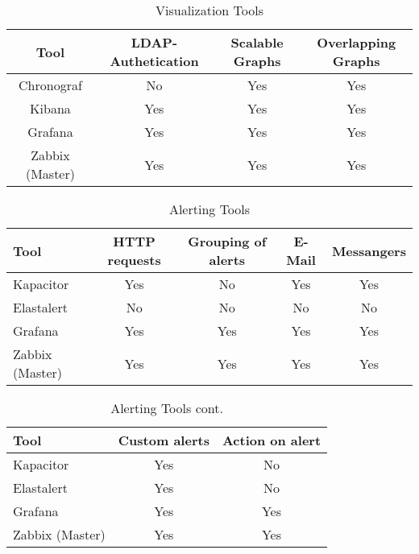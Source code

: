 \begin{table}[]
\centering
\caption{Visualization Tools}
\label{my-label}
\begin{tabular}{cccc}
	\hline
Tool & LDAP-Authetication         & Scalable Graphs             & Overlapping Graphs          \\
\hline
Chronograf                   & No & Yes                         & Yes                         \\
Kibana                       & Yes                        & Yes & Yes                         \\
Grafana                      & Yes                        & Yes & Yes                         \\
Zabbix (Master)              & Yes                        & Yes                         & Yes\\
\hline
\end{tabular}
\end{table}

\begin{table}[]
	\centering
	\caption{Alerting Tools}
	\label{my-label}
	\begin{tabular}{lcccc}
		\hline
		Tool & HTTP requests & Grouping of alerts         & E-Mail                      & Messangers \\
		\hline
		Kapacitor                    & Yes           & No & Yes                         & Yes \\
		Elastalert                   & No            & No                         & No  & No  \\
		Grafana                      & Yes           & Yes                        & Yes & Yes \\
		Zabbix (Master)              & Yes           & Yes                        & Yes                         & Yes \\
		\hline
	\end{tabular}
\end{table}

\begin{table}[]
	\centering
	\caption{Alerting Tools cont.}
	\label{my-label}
	\begin{tabular}{lcc}
		\hline
		Tool & Custom alerts & Action on alert \\
		\hline
		Kapacitor                    & Yes           & No              \\
		Elastalert                   & Yes           & No              \\
		Grafana                      & Yes           & Yes             \\
		Zabbix (Master)              & Yes           & Yes           \\
		\hline 
	\end{tabular}
\end{table}